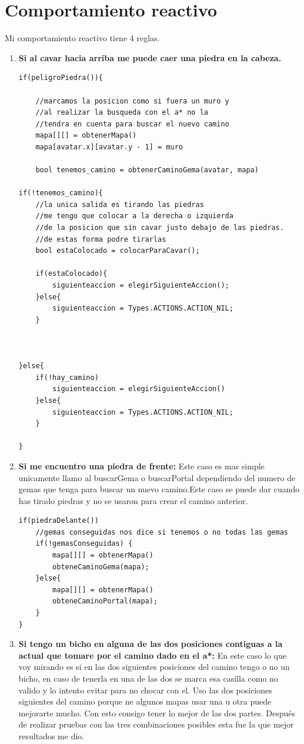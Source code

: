 \documentclass[titlepage]{article}
\begin{document}
	\section{Comportamiento reactivo}
	Mi comportamiento reactivo tiene 4 reglas.
	\begin{enumerate}
		\item \textbf{Si al cavar hacia arriba me puede caer una piedra en la cabeza.}
		
		\begin{lstlisting}
if(peligroPiedra()){
			
	//marcamos la posicion como si fuera un muro y
	//al realizar la busqueda con el a* no la
	//tendra en cuenta para buscar el nuevo camino
	mapa[][] = obtenerMapa()
	mapa[avatar.x][avatar.y - 1] = muro
		
	bool tenemos_camino = obtenerCaminoGema(avatar, mapa)
	
if(!tenemos_camino){
	//la unica salida es tirando las piedras
	//me tengo que colocar a la derecha o izquierda
	//de la posicion que sin cavar justo debajo de las piedras.
	//de estas forma podre tirarlas
	bool estaColocado = colocarParaCavar();
		
	if(estaColocado){
		siguienteaccion = elegirSiguienteAccion();
	}else{
		siguienteaccion = Types.ACTIONS.ACTION_NIL;
	}
	
		
		
}else{
	if(!hay_camino)
		siguienteaccion = elegirSiguienteAccion()
	}else{
		siguienteaccion = Types.ACTIONS.ACTION_NIL;
	}
		
}
		\end{lstlisting}
		\item \textbf{Si me encuentro una piedra de frente:}
		Este caso es mas simple unicamente llamo al buscarGema o buscarPortal dependiendo del numero de gemas que tenga para buscar un nuevo camino.Este caso se puede dar cuando has tirado piedras y no se usaron para crear el camino anterior.
		
		\begin{lstlisting}
if(piedraDelante())
	//gemas conseguidas nos dice si tenemos o no todas las gemas
	if(!gemasConseguidas) {
		mapa[][] = obtenerMapa()
		obteneCaminoGema(mapa);
	}else{
		mapa[][] = obtenerMapa()
		obteneCaminoPortal(mapa);
	}
}
\end{lstlisting}
		\item \textbf{Si tengo un bicho en alguna de las dos posiciones contiguas a la actual que tomare por el camino dado en el a*: }
		En este caso lo que voy mirando es si en las dos siguientes posiciones del camino tengo o no un bicho, en caso de tenerla en una de las dos se marca esa casilla como no valido y lo intento evitar para no chocar con el. Uso las dos posiciones siguientes del camino porque ne algunos mapas usar una u otra puede mejorarte mucho. Con esto consigo tener lo mejor de las dos partes. Después de realizar pruebas con las tres combinaciones posibles esta fue la que mejor resultados me dio.
		

\end{enumerate}
\end{document}
